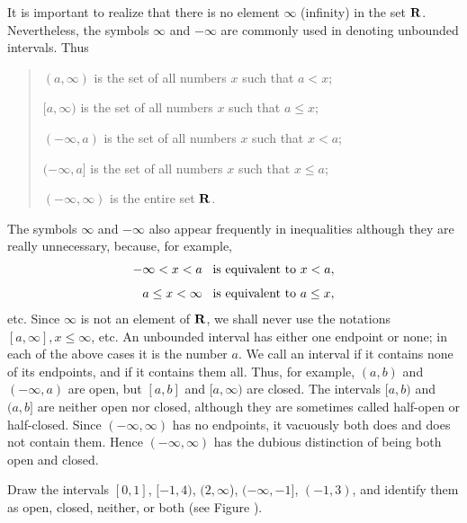 It is important to realize that
there is no element $\infty$ (infinity) in the set $\mathrm{\bf R}$.
Nevertheless, the symbols $\infty$ and $-\infty$ are commonly used
in denoting unbounded intervals.
Thus
\begin{quote}
$(a, \infty)$ is the set of all numbers $x$ such that $a < x$;

$[a, \infty)$ is the set of all numbers $x$ such that $a \leq x$;

$(-\infty, a)$ is the set of all numbers $x$ such that $x < a$;

$(-\infty, a]$ is the set of all numbers $x$ such that $x \leq a$;

$(-\infty, \infty)$ is the entire set $\mathrm{\bf R}$.
\end{quote}
The symbols $\infty$ and $-\infty$ also appear frequently
in inequalities although they are really unnecessary,
because, for example,
\[
\begin{array}{r}
-\infty < x < a \;\;\; \mbox{is equivalent to $x < a$},  \vspace{.1in} \\
a \leq x < \infty \;\;\;\mbox{is equivalent to $a \leq x$}, 
\end{array}
\]
etc.
Since $\infty$ is not an element of $\mathrm{\bf R}$,
we shall never use the notations $[a, \infty], x \leq \infty$, etc.
An unbounded interval has either one endpoint or none;
in each of the above cases it is the number $a$.
We call an interval  if it contains none of its endpoints,
and  if it contains them all.
Thus, for example, $(a, b)$ and $(-\infty, a)$ are open,
but $[a, b]$ and $[a, \infty)$ are closed.
The intervals $[a, b)$ and $(a, b]$ are neither open nor closed,
although they are sometimes called half-open or half-closed.
Since $(-\infty, \infty)$ has no endpoints,
it vacuously both does and does not contain them.
Hence $(-\infty, \infty)$ has the dubious distinction
of being both open and closed.


\begin{example}
\label{exam 1.1.1}
Draw the intervals
$[0, 1]$, $[-1, 4)$, $(2, \infty$), $(-\infty, -1]$, $(-1, 3)$,
and identify them as open, closed, neither,
or both (see Figure ).
\end{example}

